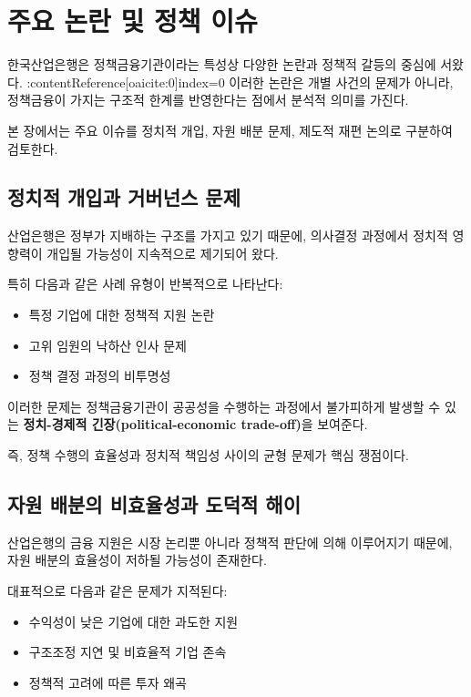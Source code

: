 \section{주요 논란 및 정책 이슈}

한국산업은행은 정책금융기관이라는 특성상 다양한 논란과 정책적 갈등의 중심에 서왔다. :contentReference[oaicite:0]{index=0}  
이러한 논란은 개별 사건의 문제가 아니라, 정책금융이 가지는 구조적 한계를 반영한다는 점에서 분석적 의미를 가진다.

본 장에서는 주요 이슈를 정치적 개입, 자원 배분 문제, 제도적 재편 논의로 구분하여 검토한다.

\subsection{정치적 개입과 거버넌스 문제}

산업은행은 정부가 지배하는 구조를 가지고 있기 때문에, 의사결정 과정에서 정치적 영향력이 개입될 가능성이 지속적으로 제기되어 왔다.

특히 다음과 같은 사례 유형이 반복적으로 나타난다:

\begin{itemize}
    \item 특정 기업에 대한 정책적 지원 논란
    \item 고위 임원의 낙하산 인사 문제
    \item 정책 결정 과정의 비투명성
\end{itemize}

이러한 문제는 정책금융기관이 공공성을 수행하는 과정에서 불가피하게 발생할 수 있는 \textbf{정치-경제적 긴장(political-economic trade-off)}을 보여준다.

즉, 정책 수행의 효율성과 정치적 책임성 사이의 균형 문제가 핵심 쟁점이다.

\subsection{자원 배분의 비효율성과 도덕적 해이}

산업은행의 금융 지원은 시장 논리뿐 아니라 정책적 판단에 의해 이루어지기 때문에, 자원 배분의 효율성이 저하될 가능성이 존재한다.

대표적으로 다음과 같은 문제가 지적된다:

\begin{itemize}
    \item 수익성이 낮은 기업에 대한 과도한 지원
    \item 구조조정 지연 및 비효율적 기업 존속
    \item 정책적 고려에 따른 투자 왜곡
\end{itemize}

